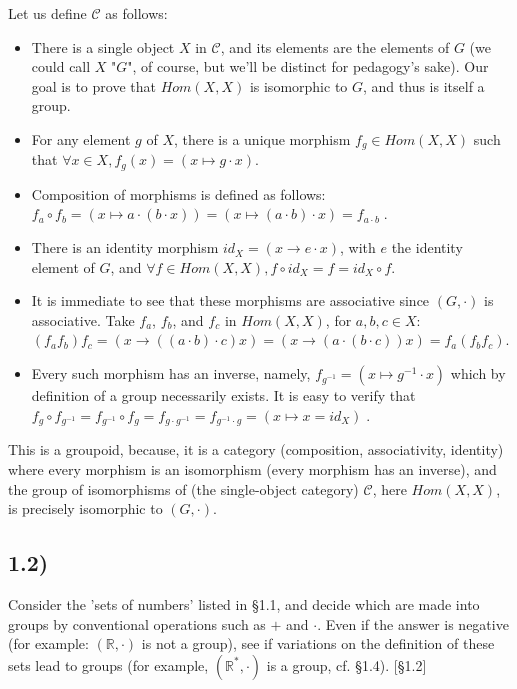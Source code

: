 \documentclass[12pt, letterpaper, twoside]{report}
\begin{document}
Let us define $\mathcal{C}$ as follows:
\begin{itemize}
	\item There is a single object $X$ in $\mathcal{C}$, and its elements are the elements of $G$ (we could call $X$ "$G$", of course, but we'll be distinct for pedagogy's sake). Our goal is to prove that $Hom(X, X)$ is isomorphic to $G$, and thus is itself a group.
	\item For any element $g$ of $X$, there is a unique morphism $f_g \in Hom(X, X)$ such that $\forall x \in X, f_g(x) = (x \mapsto g \cdot x)$.
	\item Composition of morphisms is defined as follows: $f_a \circ f_b = (x \mapsto a \cdot (b \cdot x)) = (x \mapsto (a \cdot b) \cdot x) = f_{a \cdot b} \;$.
	\item There is an identity morphism $id_X = (x \to e \cdot x)$, with $e$ the identity element of $G$, and $\forall f \in Hom(X, X), f \circ id_X = f = id_X \circ f$.
	\item It is immediate to see that these morphisms are associative since $(G, \cdot)$ is associative. Take $f_a$, $f_b$, and $f_c$ in $Hom(X,X)$, for $a,b,c \in X$: $(f_a f_b) f_c = (x \to ((a \cdot b) \cdot c) x) = (x \to (a \cdot (b \cdot c))x) = f_a (f_b f_c)$.
	\item Every such morphism has an inverse, namely, $f_{g^{-1}} = (x \mapsto g^{-1} \cdot x)$ which by definition of a group necessarily exists. It is easy to verify that $f_g \circ f_{g^{-1}} = f_{g^{-1}} \circ f_g = f_{g \cdot g^{-1}} = f_{g^{-1} \cdot g} = (x \mapsto x = id_X) \;$.
\end{itemize}

This is a groupoid, because, it is a category (composition, associativity, identity) where every morphism is an isomorphism (every morphism has an inverse), and the group of isomorphisms of (the single-object category) $\mathcal{C}$, here $Hom(X,X)$, is precisely isomorphic to $(G, \cdot)$.


\subsection*{1.2)}

Consider the 'sets of numbers' listed in §1.1, and decide which are made into groups by conventional operations such as $+$ and $\cdot$. Even if the answer is negative (for example: $(\mathbb{R}, \cdot)$ is not a group), see if variations on the definition of these sets lead to groups (for example, $(\mathbb{R}^*, \cdot)$ is a group, cf. §1.4). [§1.2]
\end{document}

